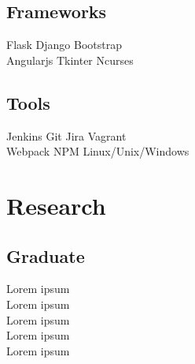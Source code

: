 \documentclass[]{Resume_Piyush}
\begin{document}
\begin{minipage}[t]{0.33\textwidth}
\subsection{Frameworks}
Flask \textbullet{}   Django \textbullet{} Bootstrap \\
\textbullet{} Angularjs \textbullet{} Tkinter \textbullet{} Ncurses \\
\sectionsep

\subsection{Tools}
Jenkins \textbullet{} Git \textbullet{} Jira \textbullet{} Vagrant \\
\textbullet{} Webpack \textbullet{} NPM\textbullet{} Linux/Unix/Windows
\sectionsep






\section{Research}
\subsection{Graduate}
Lorem ipsum \\
Lorem ipsum \\
Lorem ipsum \\
Lorem ipsum \\
Lorem ipsum \\
\sectionsep


\end{minipage}
\end{document}
